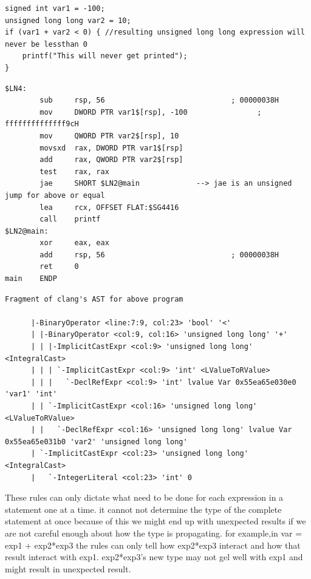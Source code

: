 \documentclass{article}
\begin{document}
\begin{verbatim}
signed int var1 = -100;
unsigned long long var2 = 10;
if (var1 + var2 < 0) { //resulting unsigned long long expression will never be lessthan 0
    printf("This will never get printed");
}
\end{verbatim}
\begin{verbatim}
$LN4:
        sub     rsp, 56                             ; 00000038H
        mov     DWORD PTR var1$[rsp], -100                ; ffffffffffffff9cH
        mov     QWORD PTR var2$[rsp], 10
        movsxd  rax, DWORD PTR var1$[rsp]
        add     rax, QWORD PTR var2$[rsp]
        test    rax, rax
        jae     SHORT $LN2@main             --> jae is an unsigned jump for above or equal
        lea     rcx, OFFSET FLAT:$SG4416
        call    printf
$LN2@main:
        xor     eax, eax
        add     rsp, 56                             ; 00000038H
        ret     0
main    ENDP
\end{verbatim}
\begin{verbatim}
Fragment of clang's AST for above program

      |-BinaryOperator <line:7:9, col:23> 'bool' '<'
      | |-BinaryOperator <col:9, col:16> 'unsigned long long' '+'
      | | |-ImplicitCastExpr <col:9> 'unsigned long long' <IntegralCast>
      | | | `-ImplicitCastExpr <col:9> 'int' <LValueToRValue>
      | | |   `-DeclRefExpr <col:9> 'int' lvalue Var 0x55ea65e030e0 'var1' 'int'
      | | `-ImplicitCastExpr <col:16> 'unsigned long long' <LValueToRValue>
      | |   `-DeclRefExpr <col:16> 'unsigned long long' lvalue Var 0x55ea65e031b0 'var2' 'unsigned long long'
      | `-ImplicitCastExpr <col:23> 'unsigned long long' <IntegralCast>
      |   `-IntegerLiteral <col:23> 'int' 0
\end{verbatim}


These rules can only dictate what need to be done for each expression in a
statement one at a time.  it cannot not determine the type of the complete
statement at once because of this we might end up with unexpected results if
we are not careful enough about how the type is propagating.
for example,in var = exp1 + exp2*exp3 the rules can only tell how exp2*exp3
interact and how that result interact with exp1. exp2*exp3's new type may not
gel well with exp1 and might result in unexpected result.
\end{document}
